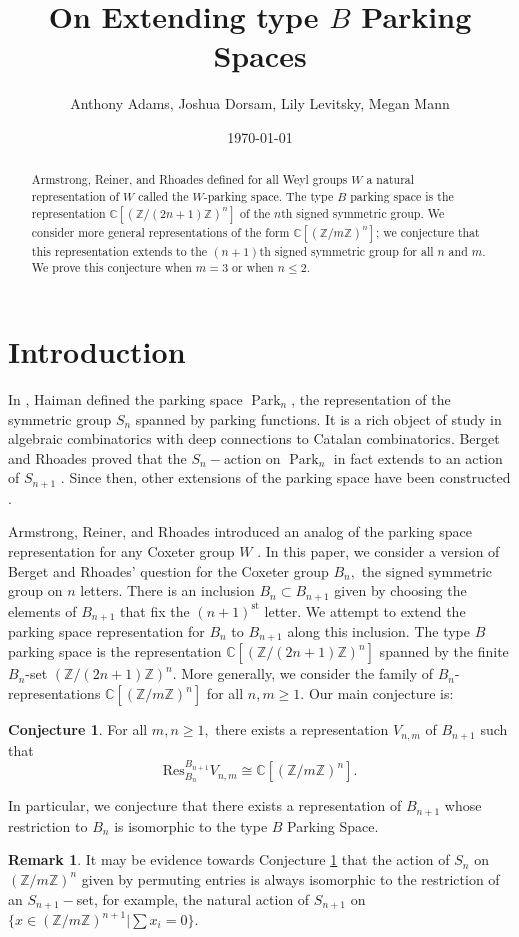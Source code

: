 \documentclass{amsart}
\title{On Extending type $B$ Parking Spaces}
\author{Anthony Adams, Joshua Dorsam, Lily Levitsky, Megan Mann}
\date{\today}
\theoremstyle{plain}
\theoremstyle{definition}
\newtheorem{conjecture}[theorem]{Conjecture}
\newtheorem{remark}[theorem]{Remark}
\DeclareMathOperator{\Park}{Park}
\newcommand{\Z}{\mathbb{Z}}
\begin{document}
\begin{abstract}
    Armstrong, Reiner, and Rhoades defined for all Weyl groups $W$ a natural representation of $W$ called the $W$-parking space. The type $B$ parking space is the representation $\mathbb{C}[(\mathbb{Z}/(2n+1)\mathbb{Z})^n]$ of the $n$th signed symmetric group. We consider more general representations of the form $\mathbb{C}[(\mathbb{Z}/m\mathbb{Z})^n]$; we conjecture that this representation extends to the $(n+1)$th signed symmetric group for all $n$ and $m$. We prove this conjecture when $m = 3$ or when $n \leq 2$.
\end{abstract}

\maketitle

\section{Introduction}

In \cite{Haiman}, Haiman defined the parking space $\Park_n$, the representation of the symmetric group $S_n$ spanned by parking functions. It is a rich object of study in algebraic combinatorics with deep connections to Catalan combinatorics. Berget and Rhoades proved that the $S_n-$action on $\Park_n$ in fact extends to an action of $S_{n+1}$ \cite{bergetrhoades14}.
Since then, other extensions of the parking space have been constructed \cite{konvatewari21, KST21}.

Armstrong, Reiner, and Rhoades introduced an analog of the parking space representation for any Coxeter group $W$ \cite{ARR15}.
In this paper, we consider a version of Berget and Rhoades' question for the Coxeter group $B_n,$ the signed symmetric group on $n$ letters. There is an inclusion $B_n\subset B_{n+1}$ given by choosing the elements of $B_{n+1}$ that fix the $(n+1)^{\text{st}} $ letter. We attempt to extend the parking space representation for $B_n$ to $B_{n+1}$ along this inclusion. The type $B$ parking space is the representation $\mathbb{C}[(\Z/(2n+1)\Z)^n]$ spanned by the finite $B_n$-set $(\Z/(2n+1)\Z)^n$.
More generally, we consider the family of $B_n$-representations $\mathbb{C}[(\mathbb{Z}/m\mathbb{Z})^n]$ for all $n,m \geq 1$. Our main conjecture is:
\begin{conjecture}\label{conjecture: main}
    For all $m,n\ge 1,$ there exists a representation $V_{n,m}$ of $B_{n+1}$ such that $$\mathrm{Res}^{B_{n+1}}_{B_n}V_{n,m}\cong \mathbb{C}[(\mathbb{Z}/m\mathbb{Z})^n].$$
\end{conjecture}
In particular, we conjecture that there exists a representation of $B_{n+1}$ whose restriction to $B_n$ is isomorphic to the type $B$ Parking Space. 
\begin{remark}
    It may be evidence towards Conjecture \ref{conjecture: main} that the action of $S_n$ on $(\Z/m\Z)^n$ given by permuting entries is always isomorphic to the restriction of an $S_{n+1}-$set,  for example, the natural action of $S_{n+1}$ on $\{x\in (\Z/m\Z)^{n+1}|\sum x_i =0\}$. 
\end{remark}
\end{document}
